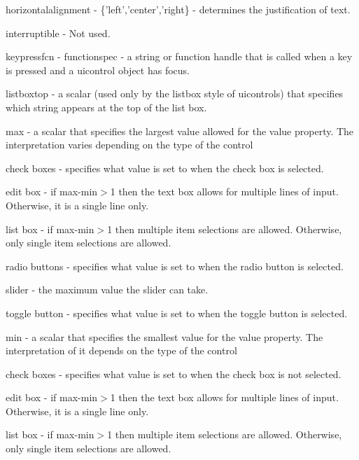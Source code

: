\begin{DoxyItemize}
\item {\ttfamily horizontalalignment} -\/ {\ttfamily \{'left','center','right\}} -\/ determines the justification of text.  
\item {\ttfamily interruptible} -\/ Not used.  
\item {\ttfamily keypressfcn} -\/ {\ttfamily functionspec} -\/ a string or function handle that is called when a key is pressed and a uicontrol object has focus.  
\item {\ttfamily listboxtop} -\/ a scalar (used only by the listbox style of uicontrols) that specifies which string appears at the top of the list box.  
\item {\ttfamily max} -\/ a scalar that specifies the largest value allowed for the {\ttfamily value} property. The interpretation varies depending on the type of the control  
\begin{DoxyItemize}
\item {\ttfamily check boxes} -\/ specifies what {\ttfamily value} is set to when the check box is selected.  
\item {\ttfamily edit box} -\/ if {\ttfamily max-\/min$>$1} then the text box allows for multiple lines of input. Otherwise, it is a single line only.  
\item {\ttfamily list box} -\/ if {\ttfamily max-\/min$>$1} then multiple item selections are allowed. Otherwise, only single item selections are allowed.  
\item {\ttfamily radio buttons} -\/ specifies what {\ttfamily value} is set to when the radio button is selected.  
\item {\ttfamily slider} -\/ the maximum value the slider can take.  
\item {\ttfamily toggle button} -\/ specifies what {\ttfamily value} is set to when the toggle button is selected.  
\end{DoxyItemize}
\item {\ttfamily min} -\/ a scalar that specifies the smallest value for the {\ttfamily value} property. The interpretation of it depends on the type of the control  
\begin{DoxyItemize}
\item {\ttfamily check boxes} -\/ specifies what {\ttfamily value} is set to when the check box is not selected.  
\item {\ttfamily edit box} -\/ if {\ttfamily max-\/min$>$1} then the text box allows for multiple lines of input. Otherwise, it is a single line only.  
\item {\ttfamily list box} -\/ if {\ttfamily max-\/min$>$1} then multiple item selections are allowed. Otherwise, only single item selections are allowed.  

\end{DoxyItemize}
\end{DoxyItemize}
